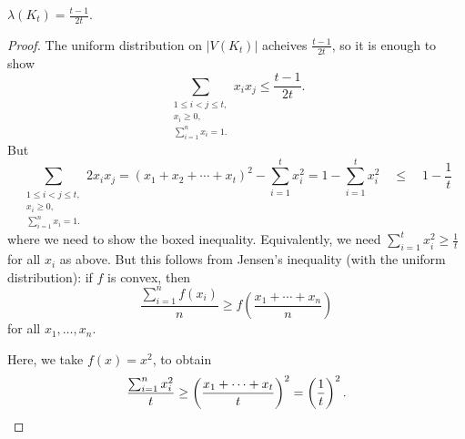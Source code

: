 \begin{lemma}
$\lambda(K_t) = \frac{t-1}{2 t}$.
\end{lemma}
\begin{proof}	
The uniform distribution on $|V(K_t)|$ acheives $\frac{t-1}{2t}$, so it is enough to show
\[
\sum_{\substack{1\leq i<j \leq t,\\ x_i\geq 0,\\ \sum_{i=1}^n x_i=1.}} x_i x_j \leq \frac{t-1}{2t}.
\]
But
\[
\sum_{\substack{1\leq i<j \leq t,\\ x_i\geq 0,\\ \sum_{i=1}^n x_i=1.}} 2x_i x_j  = (x_1+x_2+\dotsm + x_t)^2 - \sum_{i=1}^t x_i^2 = 1- \sum_{i=1}^t x_i^2 \quad\boxed{\leq} \quad 1 - \frac{1}{t}
\]
where we need to show the boxed inequality.
Equivalently, we need $\sum_{i=1}^t x_i^2 \geq \frac{1}{t}$ for all $x_i$ as above. But this follows from Jensen's inequality (with the uniform distribution): if $f$ is convex, then
\[
\frac{\sum_{i=1}^n f(x_i)}{n} \geq f \left( \frac{x_1+\dotsm + x_n}{n}\right)
\]
for all $x_1,\dotsc,x_n$. 

Here, we take $f(x)=x^2$, to obtain
\[
\frac{\sum_{i=1}^n x_i^2}{t}\geq \left(\frac{x_1+\dotsm + x_t}{t}\right)^2 = \left( \frac{1}{t} \right)^2. \qedhere
\]
\end{proof}

